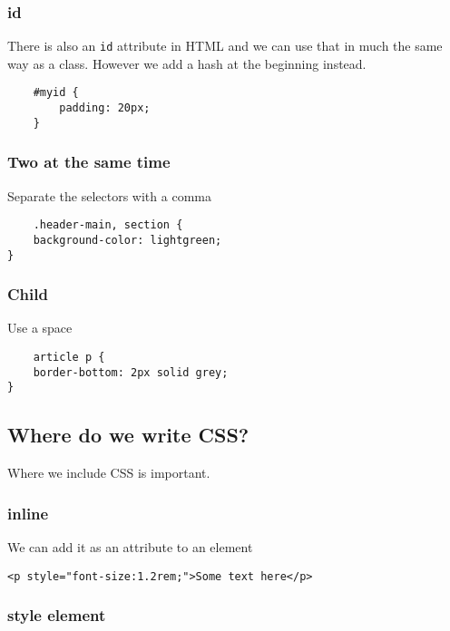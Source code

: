 \subsubsection{id}

There is also an \texttt{id} attribute in HTML and we can use that in much the same way as a class. However we add a hash at the beginning instead.

\begin{verbatim}
    #myid {
        padding: 20px;
    }
\end{verbatim}

\subsubsection{Two at the same time}

Separate the selectors with a comma

\begin{verbatim}
    .header-main, section {
	background-color: lightgreen;
}
\end{verbatim}

\subsubsection{Child}

Use a space

\begin{verbatim}
    article p {
	border-bottom: 2px solid grey;
}
\end{verbatim}


\subsection{Where do we write CSS?}

Where we include CSS is important.

\subsubsection{inline}

We can add it as an attribute to an element

\begin{verbatim}
<p style="font-size:1.2rem;">Some text here</p>
\end{verbatim}

\subsubsection{style element}

